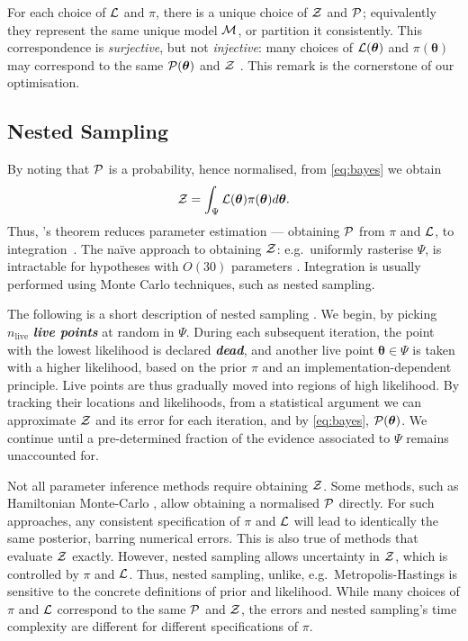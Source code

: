 \documentclass[usenatbib]{mnras}
\begin{document}
For each choice of ${\cal L}$ and $\pi$, there is a unique choice of
${\cal Z}$ and ${\cal P}$; equivalently they represent the same unique
model ${\cal M}$, or partition it consistently. This correspondence is
\emph{surjective}, but not \emph{injective}: many choices of
\({\cal L}(\bm{\theta})\) and \(\pi (\bm{\theta})\) may correspond to
the same \( {\cal P} (\bm{\theta})\) and \({\cal Z}\)
\citep{chen-ferroz-hobson}. This remark is the cornerstone of our
optimisation.

\subsection{Nested Sampling}\label{sec:org36366f8}

By noting that ${\cal P}$ is a probability, hence normalised, from
\cref{eq:bayes} we obtain
\begin{equation}
  \label{eq:def-z}
  {\cal Z} = \int_{\Psi} {\cal L}(\bm{\theta}) \pi(\bm{\theta}) d\bm{\theta}. 
\end{equation}
Thus, \citeauthor{1763}'s theorem reduces parameter estimation ---
obtaining ${\cal P}$ from $\pi$ and ${\cal L}$, to
integration~\citep{bayes-integration}. The naïve approach to obtaining
\({\cal Z}\): e.g.~uniformly rasterise \(\Psi\), is intractable for
hypotheses with \(O(30)\) parameters
\citep{Caflisch_1998}. Integration is usually performed using Monte
Carlo techniques, such as nested sampling.

The following is a short description of nested sampling
\citep{Skilling2006}. We begin, by picking \(n_\text{live}\)
\textbf{\emph{live points}} at random in $\Psi$. During each
subsequent iteration, the point with the lowest likelihood is declared
\emph{\textbf{dead}}, and another live point $\bm{\theta}\in\Psi$ is
taken with a higher likelihood, based on the prior $\pi$ and an
implementation-dependent principle. Live points are thus gradually
moved into regions of high likelihood. By tracking their locations and
likelihoods, from a statistical argument we can approximate ${\cal Z}$
and its error for each iteration, and by \cref{eq:bayes},
${\cal P}(\bm{\theta})$. We continue until a pre-determined fraction
of the evidence associated to $\Psi$ remains unaccounted for.

Not all parameter inference methods require obtaining ${\cal Z}$. Some
methods, such as Hamiltonian Monte-Carlo \citep{1701.02434}, allow
obtaining a normalised ${\cal P}$ directly. For such approaches, any
consistent specification of $\pi$ and ${\cal L}$ will lead to
identically the same posterior, barring numerical errors. This is also
true of methods that evaluate ${\cal Z}$ exactly. However, nested
sampling allows uncertainty in ${\cal Z}$, which is controlled by
$\pi$ and ${\cal L}$. Thus, nested sampling, unlike,
e.g.~Metropolis-Hastings \citep{Metropolis-Hastings-Gibbs} is sensitive
to the concrete definitions of prior and likelihood. While many
choices of $\pi$ and ${\cal L}$ correspond to the same ${\cal P}$ and
${\cal Z}$, the errors and nested sampling's time complexity are
different for different specifications of $\pi$\citep{Skilling2006}.
\end{document}
